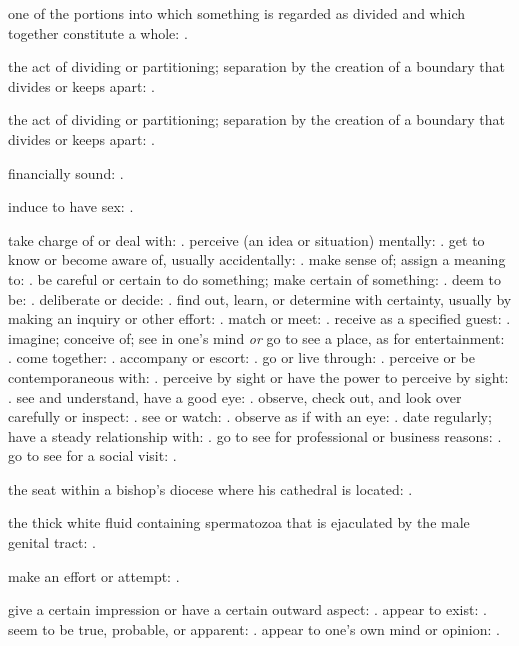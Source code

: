   one of the portions into which something is regarded as divided and which together constitute a whole: .

  the act of dividing or partitioning; separation by the creation of a boundary that divides or keeps apart: .

  the act of dividing or partitioning; separation by the creation of a boundary that divides or keeps apart: .

  financially sound: .

  induce to have sex: .

  take charge of or deal with: . perceive (an idea or situation) mentally: . get to know or become aware of, usually accidentally: . make sense of; assign a meaning to: . be careful or certain to do something; make certain of something: . deem to be: . deliberate or decide: . find out, learn, or determine with certainty, usually by making an inquiry or other effort: . match or meet: . receive as a specified guest: . imagine; conceive of; see in one's mind \textit{or} go to see a place, as for entertainment: . come together: . accompany or escort: . go or live through: . perceive or be contemporaneous with: . perceive by sight or have the power to perceive by sight: . see and understand, have a good eye: . observe, check out, and look over carefully or inspect: . see or watch: . observe as if with an eye: . date regularly; have a steady relationship with: . go to see for professional or business reasons: . go to see for a social visit: .

  the seat within a bishop's diocese where his cathedral is located: .

  the thick white fluid containing spermatozoa that is ejaculated by the male genital tract: .

  make an effort or attempt: .

  give a certain impression or have a certain outward aspect: . appear to exist: . seem to be true, probable, or apparent: . appear to one's own mind or opinion: .

